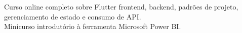 \documentclass[
    10pt,
    english,
]{article}
\begin{document}
{}
{Curso online completo sobre Flutter frontend, backend, padrões de projeto, gerenciamento de estado e consumo de API.}
\\
\noindent {}
{Minicurso introdutório à ferramenta Microsoft Power BI.}

\end{document}

